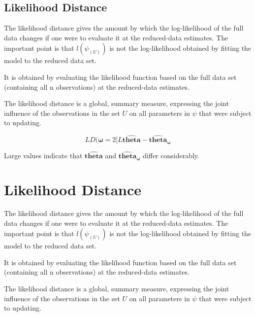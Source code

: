 \documentclass[Main.tex]{subfiles}
\begin{document}
	
\subsection{Likelihood Distance} %
The likelihood distance gives the amount by which the log-likelihood of the full data changes if one were
to evaluate it at the reduced-data estimates. The important point is that $l(\psi_{(U)})$ is not the log-likelihood
obtained by fitting the model to the reduced data set.


It is obtained by evaluating the likelihood function based on the full data set (containing all n observations) at the reduced-data estimates.


The likelihood distance is a global, summary measure, expressing the joint influence of the observations in
the set $U$ on all parameters in $\psi$  that were subject to updating.


\newpage
	\[  LD(\boldsymbol{\omega}= 2[ L\boldsymbol{\hat{theta}} - \boldsymbol{\hat{theta}_\omega} \]
	
	Large values indicate that $\boldsymbol{\hat{theta}}$ and $\boldsymbol{\hat{theta}_\omega}$ differ considerably.
	











\newpage
\section{Likelihood Distance} %
The likelihood distance gives the amount by which the log-likelihood of the full data changes if one were
to evaluate it at the reduced-data estimates. The important point is that $l(\psi_{(U)})$ is not the log-likelihood
obtained by fitting the model to the reduced data set.

It is obtained by evaluating the likelihood function based on the full data set (containing all n observations) at the reduced-data estimates.

The likelihood distance is a global, summary measure, expressing the joint influence of the observations in
the set $U$ on all parameters in $\psi$  that were subject to updating.
\end{document}
